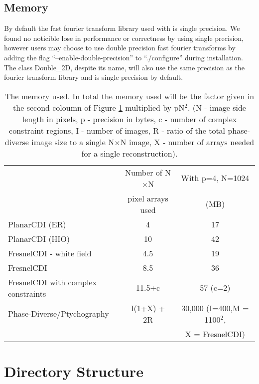 \documentclass[]{nadia}
\begin{document}
\subsection{Memory}

By default the fast fourier transform library used with \name is
single precision. We found no noticible lose in performance or
correctness by using single precision, however users may choose to use
double precision fast fourier transforms by adding the flag
``--enable-double-precision'' to ``./configure'' during installation.
The class Double\_2D, despite its name, will also use the same
precision as the fourier transform library and is single precision by
default.

\begin{table}[h!]
\begin{tabular}[h!]{lcc}
\toprule
&  Number of N$\times$N & With p=4, N=1024 \\
&  pixel arrays used & (MB) \\
\midrule
PlanarCDI (ER) & 4 & 17 \\
PlanarCDI (HIO) & 10 & 42  \\
FresnelCDI - white field & 4.5 & 19 \\
FresnelCDI & 8.5 & 36 \\
FresnelCDI with complex constraints & 11.5+c & 57 (c=2) \\
Phase-Diverse/Ptychography & I(1+X) + 2R & 30,000 (I=400,M = 1100$^2$, \\
 &                 & X = FresnelCDI)  \\
\bottomrule
\end{tabular}

\caption{\label{table:memory}The memory used. 
In total the memory used will be the factor given in the second
coloumn of Figure \ref{table:memory} multiplied by pN$^2$.
(N - image side length in pixels, p - precision in bytes, 
c - number of complex constraint regions, I - number of images, 
R - ratio of the total phase-diverse image size to a single N$\times$N image,
X - number of arrays needed for a single reconstruction). 
}
\end{table}


\newpage

\section{Directory Structure}
\end{document}
